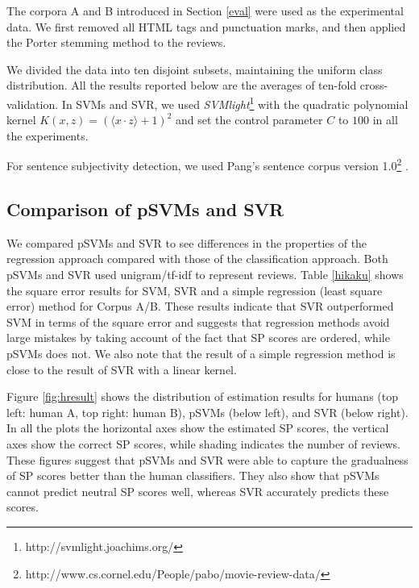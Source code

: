 \documentclass[japanese]{jnlp_1.3d}
\begin{document}
The corpora A and B introduced in Section \ref{eval} were used as the experimental data. We first removed all HTML tags and punctuation marks, and then applied the Porter stemming method \cite{Porter1980} to the reviews. 

We divided the data into ten disjoint subsets, maintaining the uniform class distribution. All the results reported below are the averages of ten-fold cross-validation. In SVMs and SVR, we used \textit{SVMlight}\footnote{http://svmlight.joachims.org/} with the quadratic polynomial kernel $K(x,z) = (\langle x \cdot z \rangle + 1)^2$ and set the control parameter $C$ to $100$ in all the experiments. 

For sentence subjectivity detection, we used Pang's sentence corpus version 1.0\footnote{http://www.cs.cornel.edu/People/pabo/movie-review-data/}
\cite{Pang2004}.

\subsection{Comparison of pSVMs and SVR}
We compared pSVMs and SVR to see differences in the properties of the regression approach compared with those of the classification approach. Both pSVMs and SVR used unigram/tf-idf to represent reviews. Table \ref{hikaku} shows the square error results for SVM, SVR and a simple regression (least square error) method for Corpus A/B.
These results indicate that SVR outperformed SVM in terms of the square error and suggests that regression methods avoid large mistakes by taking account of the fact that SP scores are ordered, while pSVMs does not. We also note that the result of a simple regression method is close to the result of SVR with a linear kernel.

Figure \ref{fig:hresult} shows the distribution of estimation results for humans (top left: human A, top right: human B), pSVMs (below left), and SVR (below right). In all the plots the horizontal axes show the estimated SP scores, the vertical axes show the correct SP scores, while shading indicates the number of reviews. These figures suggest that pSVMs and SVR were able to capture the gradualness of SP scores better than the human classifiers. They also show that pSVMs cannot predict neutral SP scores well, whereas SVR accurately predicts these scores.
\end{document}
